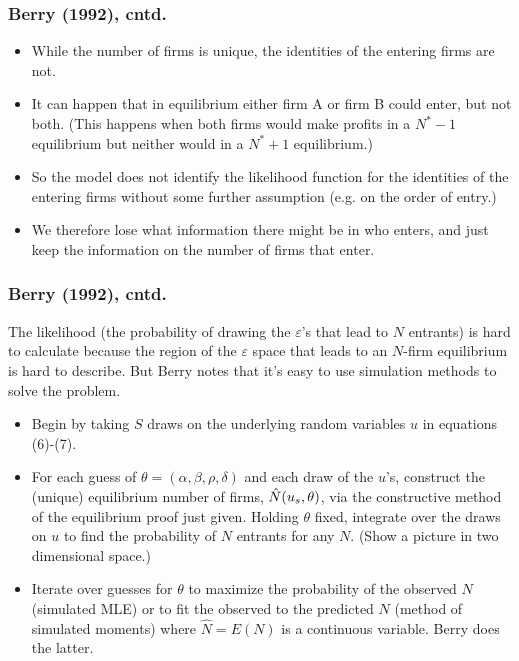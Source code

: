 \begin{frame}
\frametitle{Berry (1992), cntd.}
\begin{itemize}
\item While the number of firms is unique, the identities of the entering
firms are not.

\item It can happen that in equilibrium either firm A or firm B could enter,
but not both. (This happens when both firms would make profits in a $N^{\ast
}-1$ equilibrium but neither would in a $N^{\ast }+1$ equilibrium.)

\item So the model does not identify the likelihood function for the
identities of the entering firms without some further assumption (e.g. on
the order of entry.)

\item We therefore lose what information there might be in who enters, and
just keep the information on the number of firms that enter.
\end{itemize}

\end{frame}

\begin{frame}
\frametitle{Berry (1992), cntd.}
\footnotesize
The likelihood (the probability of drawing the $\varepsilon $'s that lead to 
$N$ entrants) is hard to calculate because the region of the $\varepsilon $
space that leads to an $N$-firm equilibrium is hard to describe. But Berry
notes that it's easy to use simulation methods to solve the problem.
\begin{itemize}
\item Begin by taking $S$ draws on the underlying random variables $u$ in
equations (6)-(7).
\item For each guess of $\theta =(\alpha ,\beta ,\rho ,\delta )$ and each
draw of the $u$'s, construct the (unique) equilibrium number of firms, $\hat{%
N}(u_{s},\theta )$, via the constructive method of the equilibrium proof
just given. Holding $\theta $ fixed, integrate over the draws on $u$ to find
the probability of $N$ entrants for any $N$. (Show a picture in two
dimensional space.)
\item Iterate over guesses for $\theta $ to maximize the probability of the
observed $N$ (simulated MLE) or to fit the observed to the predicted $N$
(method of simulated moments) where $\hat{N}=E(N)$ is a continuous variable.
Berry does the latter.
\end{itemize}
\end{frame}

